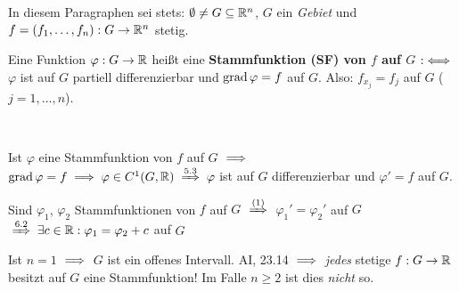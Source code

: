 \documentclass[a4paper,twoside,DIV15,BCOR12mm,chapterprefix=true,headings=twolinechapter]{scrbook}
\begin{document}
In diesem Paragraphen sei stets: $\emptyset \ne G \subseteq \mathbb{R}^n$, $G$ ein \emph{Gebiet} und $f=(f_1,\ldots,f_n): G\to\mathbb{R}^n$ stetig.

\begin{definition}
Eine Funktion $\varphi:G\to\mathbb{R}$ heißt eine \textbf{Stammfunktion (SF) von $f$ auf $G$} $:\iff$ $\varphi$ ist auf $G$ partiell differenzierbar und $\mathop{\rm grad}\nolimits\varphi = f$ auf $G$. Also: $f_{x_j} = f_j$ auf $G$ ($j=1,\ldots,n$).
\end{definition}

\begin{bemerkung}
\ 
\vspace{-1.5em}
\begin{liste}
\item Ist $\varphi$ eine Stammfunktion von $f$ auf $G$ $\implies$ $\grad\varphi = f \folgt \varphi \in C^1(G,\MdR) \folgtnach{5.3} \varphi$ ist auf $G$ differenzierbar und $\varphi' = f$ auf $G$.
\item Sind $\varphi_1$, $\varphi_2$ Stammfunktionen von $f$ auf $G$ $\folgtnach{(1)}$ $\varphi_1'=\varphi_2'$ auf $G$ $\folgtnach{6.2} \exists c\in\MdR: \varphi_1=\varphi_2+c$ auf $G$
\item Ist $n=1$ $\implies$ $G$ ist ein offenes Intervall. AI, 23.14 $\implies$ \emph{jedes} stetige $f:G\to\mathbb{R}$ besitzt auf $G$ eine Stammfunktion! Im Falle $n\ge 2$ ist dies \emph{nicht} so.
\end{liste}
\end{bemerkung}
\end{document}
